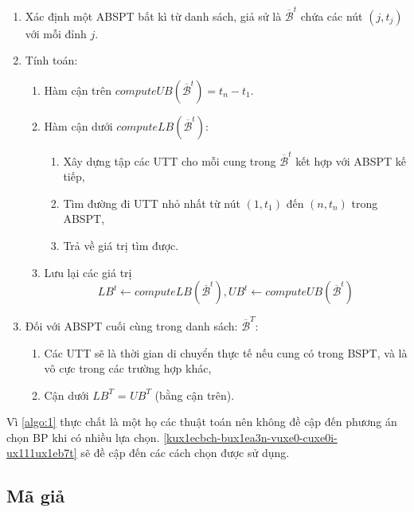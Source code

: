 \documentclass[../main.tex]{subfiles}
\begin{document}
\begin{enumerate}
\def\labelenumi{\arabic{enumi}.}
\tightlist
\item
  Xác định một ABSPT bất kì từ danh sách, giả sử là
  \(\overline {\mathcal B} ^{t}\) chứa các nút \((j, t_j)\) với mỗi đỉnh
  \(j\).
\item
  Tính toán:

  \begin{enumerate}
  \def\labelenumii{\arabic{enumii}.}
  \tightlist
  \item
    Hàm cận trên \(computeUB(\overline {\mathcal B} ^{t}) = t_n -t_1\).
  \item
    Hàm cận dưới \(computeLB(\overline {\mathcal B} ^{t}):\)

    \begin{enumerate}
    \def\labelenumiii{\arabic{enumiii}.}
    \tightlist
    \item
      Xây dựng tập các UTT cho mỗi cung trong
      \(\overline {\mathcal B} ^{t}\) kết hợp với ABSPT kế tiếp,
    \item
      Tìm đường đi UTT nhỏ nhất từ nút \((1, t_1)\) đến \((n, t_n)\)
      trong ABSPT,
    \item
      Trả về giá trị tìm được.
    \end{enumerate}
  \item
    Lưu lại các giá trị
    \[LB^t \gets computeLB(\overline {\mathcal B} ^{t}), UB^t \gets computeUB(\overline {\mathcal B} ^{t})\]
  \end{enumerate}
\item
  Đối với ABSPT cuối cùng trong danh sách: \(\overline {\mathcal B} ^{T}\):

  \begin{enumerate}
  \def\labelenumii{\arabic{enumii}.}
  \tightlist
  \item
    Các UTT sẽ là thời gian di chuyển thực tế nếu cung có trong BSPT, và
    là vô cực trong các trường hợp khác,
  \item
    Cận dưới \(LB^T\) = \(UB^T\) (bằng cận trên).
  \end{enumerate}
\end{enumerate}

Vì \autoref{algo:1} thực chất là một họ các thuật toán nên không đề cập đến
phương án chọn BP khi có nhiều lựa chọn. \autoref{kux1ecbch-bux1ea3n-vuxe0-cuxe0i-ux111ux1eb7t} sẽ đề cập đến
các cách chọn được sử dụng.

\newpage
\subsection{Mã giả}\label{muxe3-giux1ea3}
\end{document}
